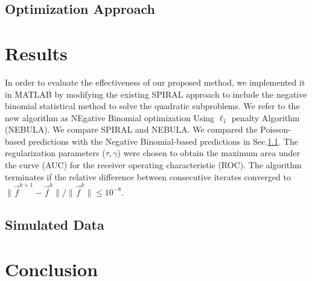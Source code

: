 \subsection{Optimization Approach}


\section{Results}
In order to evaluate the effectiveness of our proposed method, we implemented it in MATLAB by modifying the existing SPIRAL approach \cite{Marcia_SPIRALTAP} to include the negative binomial statistical method \cite{Marcia_SPIRALTAP} to solve the quadratic subproblems. We refer to the new algorithm as NEgative Binomial optimization Using $\ell_1$ penalty Algorithm (NEBULA). We compare SPIRAL and NEBULA. We compared the Poisson-based predictions with the Negative Binomial-based predictions in Sec.\ref{subsec:simulated_data}. The regularization parameters ($\tau, \gamma$) were chosen to obtain the maximum area under the curve (AUC) for the receiver operating characteristic (ROC). The algorithm terminates if the relative difference between consecutive iterates converged to $\|\vec{f}^{k+1} - \vec{f}^{k}\|/\|\vec{f}^{k}\| \leq 10^{-8}$.

\subsection{Simulated Data}
\label{subsec:simulated_data}


\section{Conclusion}


	\vfill\pagebreak
	
	
	

